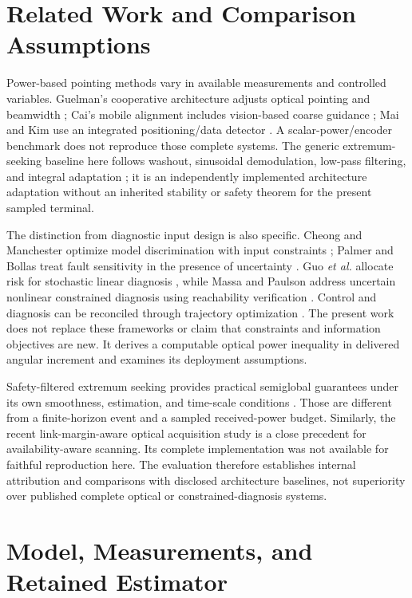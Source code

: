 \documentclass[10pt,journal]{IEEEtran}
\begin{document}
\section{Related Work and Comparison Assumptions}
Power-based pointing methods vary in available measurements and controlled variables. Guelman's cooperative architecture adjusts optical pointing and beamwidth \cite{guelman}; Cai's mobile alignment includes vision-based coarse guidance \cite{cai}; Mai and Kim use an integrated positioning/data detector \cite{mai}. A scalar-power/encoder benchmark does not reproduce those complete systems. The generic extremum-seeking baseline here follows washout, sinusoidal demodulation, low-pass filtering, and integral adaptation \cite{es}; it is an independently implemented architecture adaptation without an inherited stability or safety theorem for the present sampled terminal.

The distinction from diagnostic input design is also specific. Cheong and Manchester optimize model discrimination with input constraints \cite{cheong}; Palmer and Bollas treat fault sensitivity in the presence of uncertainty \cite{palmer}. Guo \emph{et al.} allocate risk for stochastic linear diagnosis \cite{guo}, while Massa and Paulson address uncertain nonlinear constrained diagnosis using reachability verification \cite{massa}. Control and diagnosis can be reconciled through trajectory optimization \cite{cao}. The present work does not replace these frameworks or claim that constraints and information objectives are new. It derives a computable optical power inequality in delivered angular increment and examines its deployment assumptions.

Safety-filtered extremum seeking provides practical semiglobal guarantees under its own smoothness, estimation, and time-scale conditions \cite{safees}. Those are different from a finite-horizon event and a sampled received-power budget. Similarly, the recent link-margin-aware optical acquisition study \cite{yan} is a close precedent for availability-aware scanning. Its complete implementation was not available for faithful reproduction here. The evaluation therefore establishes internal attribution and comparisons with disclosed architecture baselines, not superiority over published complete optical or constrained-diagnosis systems.

\section{Model, Measurements, and Retained Estimator}
\end{document}

